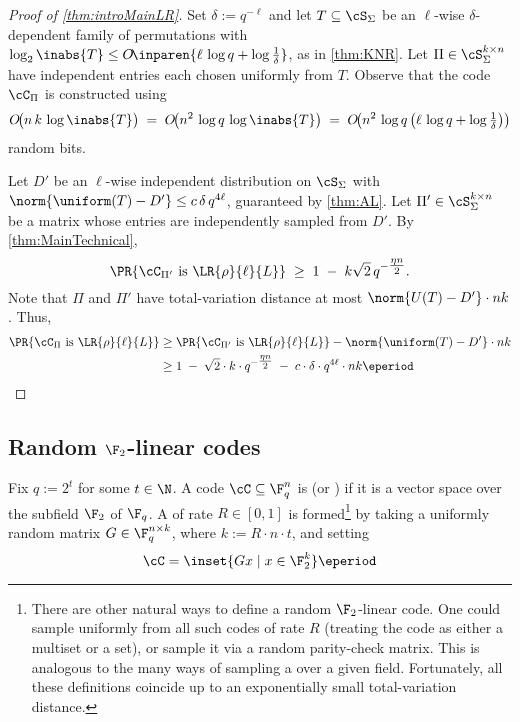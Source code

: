 \documentclass[11pt]{article}
\begin{document}
\begin{proof}[Proof of \cref{thm:introMainLR}]
Set $\delta := q^{-\ell}$ and let $T \subseteq \cS_\Sigma$ be an $\ell$-wise $\delta$-dependent family of permutations with $\log_2 \inabs{T} \le O\!\inparen{\ell \,\log q + \log \tfrac{1}{\delta}}$, as in \cref{thm:KNR}. Let $\Pi \in \cS_\Sigma^{k \times n}$ have independent entries each chosen uniformly from $T$. Observe that the code $\cC_\Pi$ is constructed using 
\[
O\!\bigl(n\,k\,\log \inabs{T}\bigr)
\;=\;
O\!\bigl(n^2 \,\log q \,\log \inabs{T}\bigr)
\;=\;
O\!\bigl(n^2 \,\log q \,\bigl(\ell \,\log q + \log \tfrac{1}{\delta}\bigr)\bigr)
\]
random bits.

Let $D'$ be an $\ell$-wise independent distribution on $\cS_\Sigma$ with $\norm{\uniform(T)-D'} \le c\,\delta \,q^{4\ell}$, guaranteed by \cref{thm:AL}. Let $\Pi' \in \cS_\Sigma^{k \times n}$ be a matrix whose entries are independently sampled from $D'$. By \cref{thm:MainTechnical},
\[
\PR{\cC_{\Pi'} \text{ is } \LR{\rho}{\ell}{L}}
\;\ge\;
1 \;-\; k\sqrt 2 \,q^{-\tfrac{\eta n}{2}}.
\]
Note that $\Pi$ and $\Pi'$ have total-variation distance at most $\norm{U(T)-D'}\cdot nk$. Thus, 
\begin{align*}
\PR{\cC_\Pi \text{ is } \LR{\rho}{\ell}{L}}
&\ge
\PR{\cC_{\Pi'} \text{ is } \LR{\rho}{\ell}{L}}
-
\norm{\uniform(T) - D'}\cdot nk
\\ &\ge
1 \;-\; \sqrt2\cdot k \cdot q^{-\tfrac{\eta n}{2}}
\;-\;
c\cdot\delta \cdot q^{4\ell}\cdot nk\eperiod
\end{align*}
\end{proof}

\subsection{Random $\F_2$-linear codes}
Fix $q := 2^t$ for some $t \in \N$. A code $\cC \subseteq \F_q^n$ is  (or ) if it is a vector space over the subfield $\F_2$ of $\F_q$. A  of rate $R \in [0,1]$ is formed\footnote{There are other natural ways to define a random $\F_2$-linear code. One could sample uniformly from all such codes of rate $R$ (treating the code as either a multiset or a set), or sample it via a random parity-check matrix. This is analogous to the many ways of sampling a  over a given field. Fortunately, all these definitions coincide up to an exponentially small total-variation distance.} by taking a uniformly random matrix $G \in \F_q^{n \times k}$, where $k := R \cdot n \cdot t$, and setting
$$
\cC = \inset{Gx \mid x \in \F_2^k}\eperiod
$$
\end{document}
